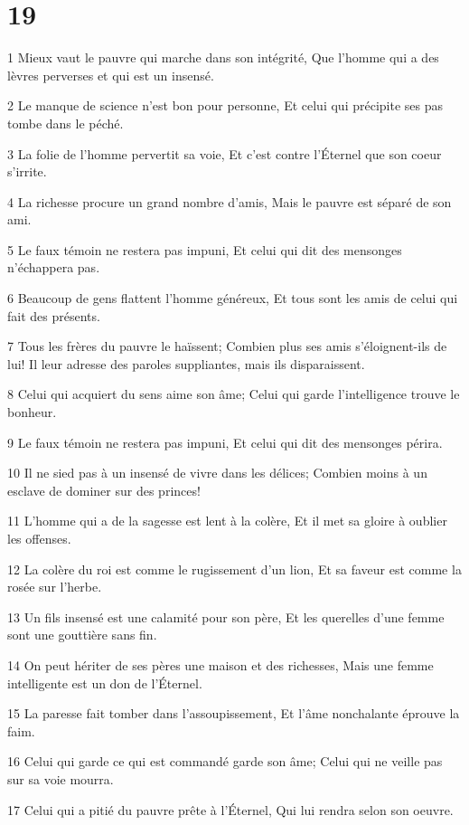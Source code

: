 \chapter{19}

\par 1 Mieux vaut le pauvre qui marche dans son intégrité, Que l'homme qui a des lèvres perverses et qui est un insensé.
\par 2 Le manque de science n'est bon pour personne, Et celui qui précipite ses pas tombe dans le péché.
\par 3 La folie de l'homme pervertit sa voie, Et c'est contre l'Éternel que son coeur s'irrite.
\par 4 La richesse procure un grand nombre d'amis, Mais le pauvre est séparé de son ami.
\par 5 Le faux témoin ne restera pas impuni, Et celui qui dit des mensonges n'échappera pas.
\par 6 Beaucoup de gens flattent l'homme généreux, Et tous sont les amis de celui qui fait des présents.
\par 7 Tous les frères du pauvre le haïssent; Combien plus ses amis s'éloignent-ils de lui! Il leur adresse des paroles suppliantes, mais ils disparaissent.
\par 8 Celui qui acquiert du sens aime son âme; Celui qui garde l'intelligence trouve le bonheur.
\par 9 Le faux témoin ne restera pas impuni, Et celui qui dit des mensonges périra.
\par 10 Il ne sied pas à un insensé de vivre dans les délices; Combien moins à un esclave de dominer sur des princes!
\par 11 L'homme qui a de la sagesse est lent à la colère, Et il met sa gloire à oublier les offenses.
\par 12 La colère du roi est comme le rugissement d'un lion, Et sa faveur est comme la rosée sur l'herbe.
\par 13 Un fils insensé est une calamité pour son père, Et les querelles d'une femme sont une gouttière sans fin.
\par 14 On peut hériter de ses pères une maison et des richesses, Mais une femme intelligente est un don de l'Éternel.
\par 15 La paresse fait tomber dans l'assoupissement, Et l'âme nonchalante éprouve la faim.
\par 16 Celui qui garde ce qui est commandé garde son âme; Celui qui ne veille pas sur sa voie mourra.
\par 17 Celui qui a pitié du pauvre prête à l'Éternel, Qui lui rendra selon son oeuvre.
